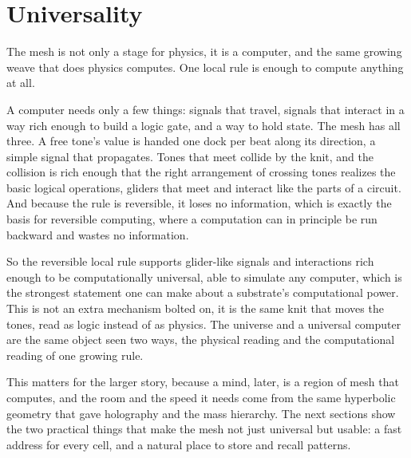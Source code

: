 \section{Universality}

The mesh is not only a stage for physics, it is a computer, and the same growing weave that does physics computes. One
local rule is enough to compute anything at all.

A computer needs only a few things: signals that travel, signals that interact in a way rich enough to build a logic
gate, and a way to hold state. The mesh has all three. A free tone's value is handed one dock per beat along its
direction, a simple signal that propagates. Tones that meet collide by the knit, and the collision is rich enough that the right
arrangement of crossing tones realizes the basic logical operations, gliders that meet and interact like the parts of a
circuit. And because the rule is reversible, it loses no information, which is exactly the basis for reversible
computing, where a computation can in principle be run backward and wastes no information.

So the reversible local rule supports glider-like signals and interactions rich enough to be computationally universal,
able to simulate any computer, which is the strongest statement one can make about a substrate's computational power.
This is not an extra mechanism bolted on, it is the same knit that moves the tones, read as logic instead of as physics.
The universe and a universal computer are the same object seen two ways, the physical reading and the computational
reading of one growing rule.

This matters for the larger story, because a mind, later, is a region of mesh that computes, and the room and the
speed it needs come from the same hyperbolic geometry that gave holography and the mass hierarchy. The next sections show
the two practical things that make the mesh not just universal but usable: a fast address for every cell, and a
natural place to store and recall patterns.
